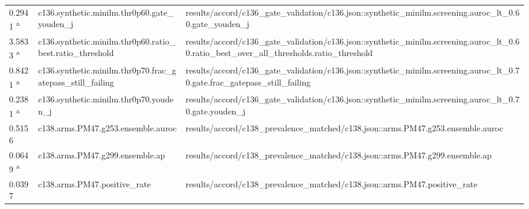 \begin{longtable}{@{}p{0.7in}p{1.9in}p{2.6in}@{}}
0.2941 \textsuperscript{a} & c136.\allowbreak{}synthetic.\allowbreak{}minilm.\allowbreak{}thr0p60.\allowbreak{}gate\_youden\_j & results/\allowbreak{}accord/\allowbreak{}c136\_gate\_validation/\allowbreak{}c136.\allowbreak{}json::synthetic\_minilm.\allowbreak{}screening.\allowbreak{}auroc\_lt\_0.\allowbreak{}60.\allowbreak{}gate\_youden\_j\\
3.5833 \textsuperscript{a} & c136.\allowbreak{}synthetic.\allowbreak{}minilm.\allowbreak{}thr0p60.\allowbreak{}ratio\_best.\allowbreak{}ratio\_threshold & results/\allowbreak{}accord/\allowbreak{}c136\_gate\_validation/\allowbreak{}c136.\allowbreak{}json::synthetic\_minilm.\allowbreak{}screening.\allowbreak{}auroc\_lt\_0.\allowbreak{}60.\allowbreak{}ratio\_best\_over\_all\_thresholds.\allowbreak{}ratio\_threshold\\
0.8421 \textsuperscript{a} & c136.\allowbreak{}synthetic.\allowbreak{}minilm.\allowbreak{}thr0p70.\allowbreak{}frac\_gatepass\_still\_failing & results/\allowbreak{}accord/\allowbreak{}c136\_gate\_validation/\allowbreak{}c136.\allowbreak{}json::synthetic\_minilm.\allowbreak{}screening.\allowbreak{}auroc\_lt\_0.\allowbreak{}70.\allowbreak{}gate.\allowbreak{}frac\_gatepass\_still\_failing\\
0.2381 \textsuperscript{a} & c136.\allowbreak{}synthetic.\allowbreak{}minilm.\allowbreak{}thr0p70.\allowbreak{}youden\_j & results/\allowbreak{}accord/\allowbreak{}c136\_gate\_validation/\allowbreak{}c136.\allowbreak{}json::synthetic\_minilm.\allowbreak{}screening.\allowbreak{}auroc\_lt\_0.\allowbreak{}70.\allowbreak{}gate.\allowbreak{}youden\_j\\
0.5156 & c138.\allowbreak{}arms.\allowbreak{}PM47.\allowbreak{}g253.\allowbreak{}ensemble.\allowbreak{}auroc & results/\allowbreak{}accord/\allowbreak{}c138\_prevalence\_matched/\allowbreak{}c138.\allowbreak{}json::arms.\allowbreak{}PM47.\allowbreak{}g253.\allowbreak{}ensemble.\allowbreak{}auroc\\
0.0649 \textsuperscript{a} & c138.\allowbreak{}arms.\allowbreak{}PM47.\allowbreak{}g299.\allowbreak{}ensemble.\allowbreak{}ap & results/\allowbreak{}accord/\allowbreak{}c138\_prevalence\_matched/\allowbreak{}c138.\allowbreak{}json::arms.\allowbreak{}PM47.\allowbreak{}g299.\allowbreak{}ensemble.\allowbreak{}ap\\
0.0397 & c138.\allowbreak{}arms.\allowbreak{}PM47.\allowbreak{}positive\_rate & results/\allowbreak{}accord/\allowbreak{}c138\_prevalence\_matched/\allowbreak{}c138.\allowbreak{}json::arms.\allowbreak{}PM47.\allowbreak{}positive\_rate\\

\end{longtable}
